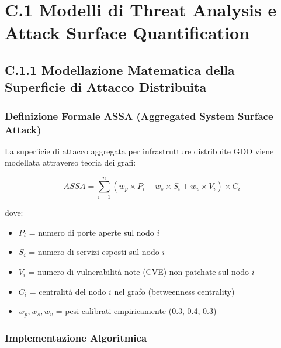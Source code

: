 \section{\texorpdfstring{\textbf{C.1 Modelli di Threat Analysis e Attack Surface Quantification}}{C.1 - Modelli di Threat Analysis e Attack Surface Quantification}}

\subsection{\texorpdfstring{\textbf{C.1.1 Modellazione Matematica della Superficie di Attacco Distribuita}}{C.1.1 - Modellazione Matematica della Superficie di Attacco Distribuita}}

\subsubsection{Definizione Formale ASSA (Aggregated System Surface Attack)}

La superficie di attacco aggregata per infrastrutture distribuite GDO viene modellata attraverso teoria dei grafi:

\begin{equation}
ASSA = \sum_{i=1}^{n} (w_p \times P_i + w_s \times S_i + w_v \times V_i) \times C_i
\end{equation}

dove:
\begin{itemize}
    \item $P_i$ = numero di porte aperte sul nodo $i$
    \item $S_i$ = numero di servizi esposti sul nodo $i$
    \item $V_i$ = numero di vulnerabilità note (CVE) non patchate sul nodo $i$
    \item $C_i$ = centralità del nodo $i$ nel grafo (betweenness centrality)
    \item $w_p, w_s, w_v$ = pesi calibrati empiricamente (0.3, 0.4, 0.3)
\end{itemize}

\subsubsection{Implementazione Algoritmica}

